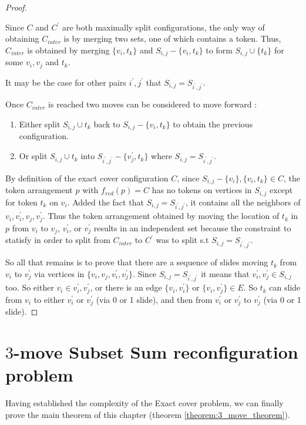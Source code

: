 \begin{proof}
\begin{obs}
Since $C$ and $C^{'}$ are both maximally split configurations, the only way of obtaining $C_{inter}$ is by merging two sets, one of which contains
a token. Thus, $C_{inter}$ is obtained by merging $\{v_i, t_k\}$ and $S_{i,j} - \{v_i, t_k\}$  to form $S_{i,j} \cup \{t_k\}$ for
some $v_i, v_j$ and $t_k$.
\end{obs}

\begin{remark}
It may be the case for other pairs $i^{'}, j^{'}$ that $S_{i,j} = S_{i^{'}, j^{'}}$.
\end{remark}

Once $C_{inter}$ is reached two moves can be considered to move forward :
\begin{enumerate}
  \item Either split $S_{i,j} \cup t_k$ back to $S_{i,j} - \{v_i,t_k\}$ to obtain the previous configuration.
  \item Or split $S_{i,j} \cup t_k$ into $S_{i^{'},j^{'}} - \{v_j^{'},t_k\}$ where $S_{i,j} = S_{i^{'}, j^{'}}$.
\end{enumerate}

By definition of the exact cover configuration $C$, since $S_{i,j} - \{v_i\}, \{v_i, t_k\} \in C$, the token
arrangement $p$ with $f_{red}(p) = C$ has no tokens on vertices in $S_{i,j}$ except for token $t_k$ on $v_i$. Added the fact
that $S_{i,j} = S_{i^{'}, j^{'}}$, it contains all the neighbors of $v_i, v_i^{'}, v_j, v_j^{'}$. Thus the token
arrangement obtained by moving the location of $t_k$ in $p$ from $v_i$ to $v_j$, $v_i^{'}$, or $v_j^{'}$ results in an independent set because
the constraint to statisfy in order to split from $C_{inter}$ to $C^{'}$ was to split s.t $S_{i,j} = S_{i^{'}, j^{'}}$.

So all that remains is to prove that there are a sequence of slides moving $t_k$ from $v_i$ to $v_j^{'}$ via vertices
in $\{v_i, v_j, v_i^{'}, v_j^{'}\}$. Since $S_{i,j} = S_{i^{'},j^{'}}$ it means that $v_i^{'}, v_j^{'} \in S_{i,j}$ too.
So either $v_i \in {v_i^{'}, v_j^{'}}$, or there is an edge $\{v_i, v_i^{'}\}$ or $\{v_i, v_j^{'}\} \in E$. So $t_k$ can slide
from $v_i$ to either $v_i^{'}$ or $v_j^{'}$ (via 0 or 1 slide), and then from
$v_i^{'}$ or $v_j^{'}$ to $v_j^{'}$ (via 0 or 1 slide).
\end{proof}

\section{$3$-move Subset Sum reconfiguration problem}
Having established the complexity of the Exact cover problem, we can finally prove the main theorem of this chapter (theorem \ref{theorem:3_move_theorem}).

